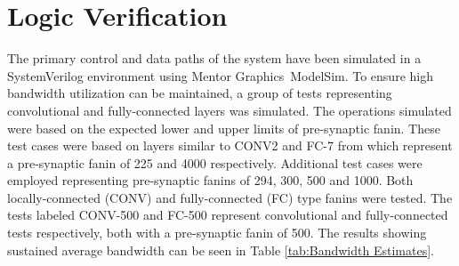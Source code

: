 

\section{Logic Verification}
\label{sec:Logic Verification}

The primary control and data paths of the system have been simulated in a SystemVerilog environment using Mentor Graphics\textregistered ~ModelSim\texttrademark.
To ensure high bandwidth utilization can be maintained, a group of tests representing convolutional and fully-connected layers was simulated.
The operations simulated were based on the expected lower and upper limits of pre-synaptic fanin. 
These test cases were based on layers similar to CONV2 and FC-7 from \cite{krizhevsky2012imagenet} which represent a pre-synaptic fanin of 225 and 4000 respectively.
Additional test cases were employed representing pre-synaptic fanins of 294, 300, 500 and 1000. Both locally-connected (CONV) and fully-connected (FC) type fanins were tested.
The tests labeled CONV-500 and FC-500 represent convolutional and fully-connected tests respectively, both with a pre-synaptic fanin of 500.
The results showing sustained average bandwidth can be seen in Table \ref{tab:Bandwidth Estimates}.


